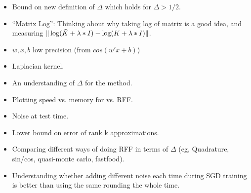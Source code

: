 \begin{itemize}
	\item Bound on new definition of $\Delta$ which holds for $\Delta > 1/2$.
	\item ``Matrix Log'': Thinking about why taking log of matrix is a good idea, and measuring $\|\log(\tilde{K} + \lambda * I) - \log(K + \lambda * I)\|$.
	\item $w,x,b$ low precision (from $cos(w'x + b)$)
	\item Laplacian kernel.
	\item An understanding of $\Delta$ for the \Nystrom method.
	\item Plotting speed vs. memory for \Nystrom vs. RFF.
	\item Noise at test time.
	\item Lower bound on error of rank k approximations.
	\item Comparing different ways of doing RFF in terms of $\Delta$ (eg, Quadrature, sin/cos, quasi-monte carlo, fastfood).
	\item Understanding whether adding different noise each time during SGD training is better than using the same rounding the whole time.
\end{itemize}